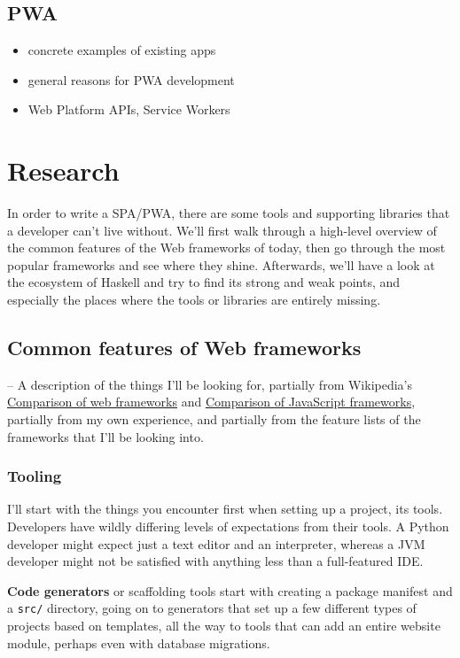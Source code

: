 \documentclass[english,odsaz]{fitthesis}
\begin{document}
\section{PWA}
\label{sec:org250af13}
\begin{itemize}
\item concrete examples of existing apps
\item general reasons for PWA development
\item Web Platform APIs, Service Workers
\end{itemize}

\chapter{Research}
\label{sec:org8d5aae7}
In order to write a SPA/PWA, there are some tools and supporting libraries that
a developer can't live without. We'll first walk through a high-level overview
of the common features of the Web frameworks of today, then go through the most
popular frameworks and see where they shine. Afterwards, we'll have a look at
the ecosystem of Haskell and try to find its strong and weak points, and
especially the places where the tools or libraries are entirely missing.

\section{Common features of Web frameworks}
\label{sec:org6d68e49}
-- A description of the things I'll be looking for, partially from
Wikipedia's \href{https://en.wikipedia.org/wiki/Comparison\_of\_web\_frameworks}{Comparison of web frameworks} and \href{https://en.wikipedia.org/wiki/Comparison\_of\_JavaScript\_frameworks}{Comparison of JavaScript
frameworks}, partially from my own experience, and partially from the feature
lists of the frameworks that I'll be looking into.

\subsection{Tooling}
\label{sec:org0909b17}
I'll start with the things you encounter first when setting up a project, its
tools. Developers have wildly differing levels of expectations from their tools. A
Python developer might expect just a text editor and an interpreter, whereas a
JVM developer might not be satisfied with anything less than a full-featured IDE.

\textbf{Code generators} or scaffolding tools start with creating a package manifest and
a \texttt{src/} directory, going on to generators that set up a few different types of
projects based on templates, all the way to tools that can add an entire website
module, perhaps even with database migrations.
\end{document}
